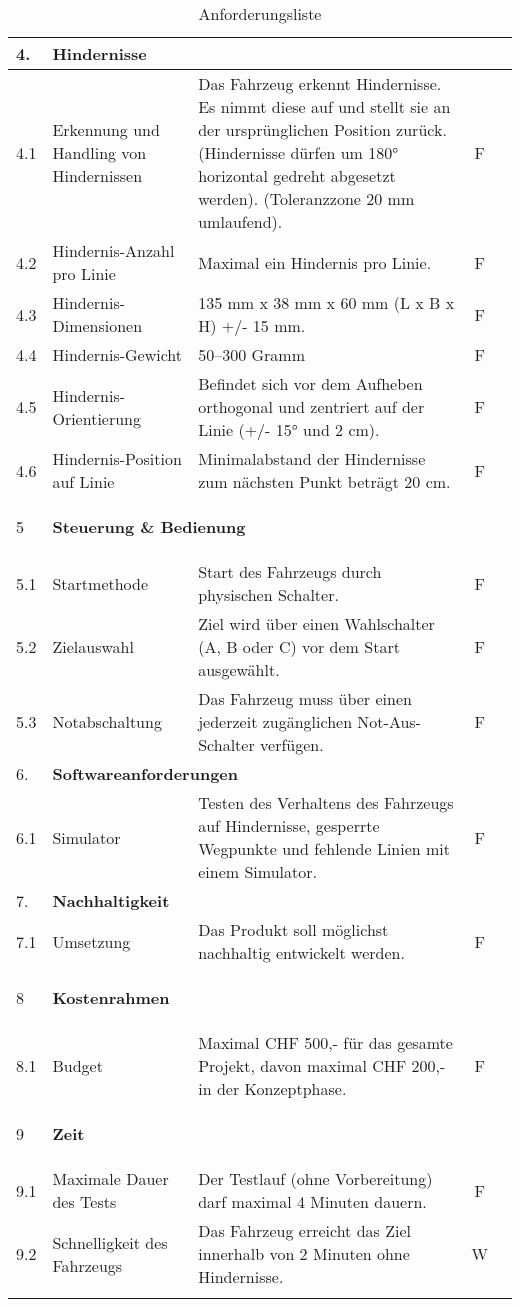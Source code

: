 \documentclass[../main.tex]{subfiles}
\begin{document}
\begin{longtable}[]{@{}lp{4.5cm}p{7.5cm}cc}
  4.  & \multicolumn{4}{l}{\textbf{Hindernisse}} \\ \hline
  \hypertarget{A4.1}{4.1} & Erkennung und Handling von Hindernissen & Das Fahrzeug erkennt Hindernisse. Es nimmt diese auf und stellt sie an der ursprünglichen Position zurück. (Hindernisse dürfen um 180° horizontal gedreht abgesetzt werden). (Toleranzzone 20 mm umlaufend). & F\\ \hline
  4.2 & Hindernis-Anzahl pro Linie & Maximal ein Hindernis pro Linie. & F\\ \hline
  4.3 & Hindernis-Dimensionen & 135 mm x 38 mm x 60 mm (L x B x H) +/- 15 mm. & F  \\ \hline
  4.4 & Hindernis-Gewicht & 50–300 Gramm & F \\ \hline
  4.5 & Hindernis-Orientierung & Befindet sich vor dem Aufheben orthogonal und zentriert auf der Linie (+/- 15° und 2 cm). & F \\ \hline
  4.6 & Hindernis-Position auf Linie & Minimalabstand der Hindernisse zum nächsten Punkt beträgt 20 cm. & F \\ \hline

   \hypertarget{A5}{5} & \multicolumn{4}{l}{\textbf{Steuerung \& Bedienung}} \\ \hline
  5.1 & Startmethode & Start des Fahrzeugs durch physischen Schalter. & F \\ \hline
  5.2 & Zielauswahl & Ziel wird über einen Wahlschalter (A, B oder C) vor dem Start ausgewählt. & F  \\ \hline
  5.3 & Notabschaltung & Das Fahrzeug muss über einen jederzeit zugänglichen Not-Aus-Schalter verfügen. & F  \\ \hline

  6.  & \multicolumn{4}{l}{\textbf{Softwareanforderungen}} \\ \hline
  \hypertarget{A6.1}{6.1} & Simulator & Testen des Verhaltens des Fahrzeugs auf Hindernisse, gesperrte Wegpunkte und fehlende Linien mit einem Simulator. & F  \\ \hline

  7.  & \multicolumn{4}{l}{\textbf{Nachhaltigkeit}} \\ \hline
  7.1 & Umsetzung & Das Produkt soll möglichst nachhaltig entwickelt werden. & F  \\ \hline

   \hypertarget{A8}{8}  & \multicolumn{4}{l}{\textbf{Kostenrahmen}} \\ \hline
   \hypertarget{A8.1}{8.1} & Budget & Maximal CHF 500,- für das gesamte Projekt, davon maximal CHF 200,- in der Konzeptphase. & F \\ \hline
  
   \hypertarget{A9}{9} & \multicolumn{4}{l}{\textbf{Zeit}} \\ \hline
  9.1 & Maximale Dauer des Tests & Der Testlauf (ohne Vorbereitung) darf maximal 4 Minuten dauern. & F \\ \hline
  9.2 & Schnelligkeit des Fahrzeugs & Das Fahrzeug erreicht das Ziel innerhalb von 2 Minuten ohne Hindernisse. & W  \\ \hline

\caption{Anforderungsliste}
\label{tab:Anforderungsliste}
\end{longtable}
\end{document}
